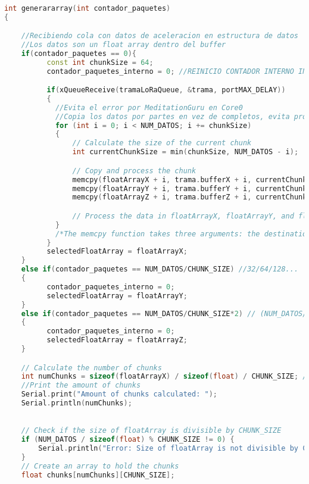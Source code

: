 \begin{lstlisting}[language=C++, caption=Función del sensor inteligente para generar arreglos de datos de aceleración en paquetes de 128 bytes]

int generararray(int contador_paquetes)
{

    //Recibiendo cola con datos de aceleracion en estructura de datos 
    //Los datos son un float array dentro del buffer
    if(contador_paquetes == 0){
          const int chunkSize = 64;
          contador_paquetes_interno = 0; //REINICIO CONTADOR INTERNO INDEPENDIENTE DE SI ENTRO POR PRIMERA VEZ

          if(xQueueReceive(tramaLoRaQueue, &trama, portMAX_DELAY))
          {
            //Evita el error por MeditationGuru en Core0
            //Copia los datos por partes en vez de completos, evita problemas de reboot
            for (int i = 0; i < NUM_DATOS; i += chunkSize)
            {
                // Calculate the size of the current chunk
                int currentChunkSize = min(chunkSize, NUM_DATOS - i);

                // Copy and process the chunk
                memcpy(floatArrayX + i, trama.bufferX + i, currentChunkSize * sizeof(float));
                memcpy(floatArrayY + i, trama.bufferY + i, currentChunkSize * sizeof(float));
                memcpy(floatArrayZ + i, trama.bufferZ + i, currentChunkSize * sizeof(float));

                // Process the data in floatArrayX, floatArrayY, and floatArrayZ here
            }
            /*The memcpy function takes three arguments: the destination pointer, the source pointer, and the number of bytes to copy.*/
          }
          selectedFloatArray = floatArrayX;
    }
    else if(contador_paquetes == NUM_DATOS/CHUNK_SIZE) //32/64/128...
    {
          contador_paquetes_interno = 0;
          selectedFloatArray = floatArrayY;
    }
    else if(contador_paquetes == NUM_DATOS/CHUNK_SIZE*2) // (NUM_DATOS/CHUNKSIZE - 1)*2
    {
          contador_paquetes_interno = 0;
          selectedFloatArray = floatArrayZ;
    }

    // Calculate the number of chunks
    int numChunks = sizeof(floatArrayX) / sizeof(float) / CHUNK_SIZE; //El numero de chunks indica el numero de bytes final
    //Print the amount of chunks
    Serial.print("Amount of chunks calculated: ");
    Serial.println(numChunks);
    

    // Check if the size of floatArray is divisible by CHUNK_SIZE
    if (NUM_DATOS / sizeof(float) % CHUNK_SIZE != 0) {
        Serial.println("Error: Size of floatArray is not divisible by CHUNK_SIZE");
    }
    // Create an array to hold the chunks
    float chunks[numChunks][CHUNK_SIZE];


\end{lstlisting}
